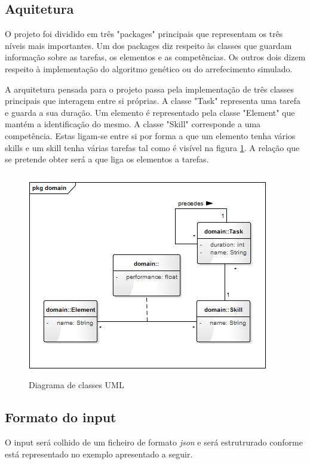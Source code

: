 \begin{titlepage}
\subsection{Aquitetura}
\justify\normalsize
O projeto foi dividido em três "packages" principais que representam os três níveis mais importantes. Um dos packages diz respeito às classes que guardam informação sobre as tarefas, os elementos e as competências. Os outros dois dizem respeito à implementação do algoritmo genético ou do arrefecimento simulado.

A arquitetura pensada para o projeto passa pela implementação de três classes principais que interagem entre si próprias. A classe "Task" representa uma tarefa e guarda a sua duração. Um elemento é representado pela classe "Element" que mantém a identificação do mesmo. A classe "Skill" corresponde a uma competência. Estas ligam-se entre si por forma a que um elemento tenha vários skills e um skill tenha várias tarefas tal como é visível na figura \ref{uml}. A relação que se pretende obter será a que liga os elementos a tarefas.

\begin{figure}[h!]
  \centering
    \includegraphics[width=10.5cm, height = 9cm]{uml.jpg}
  \caption{Diagrama de classes UML}
  \label{uml}
\end{figure}

\newpage

\subsection{Formato do input}

O input será colhido de um ficheiro de formato \textit{json} e será estrutrurado conforme está representado no exemplo apresentado a seguir. 


\end{titlepage}
